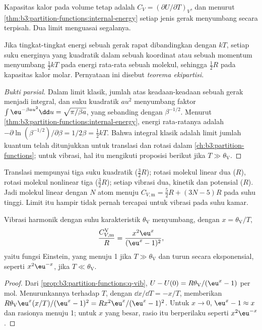 Kapasitas kalor pada volume tetap adalah $C_V = (\partial U/\partial T)_V$, dan
menurut \cref{thm:b3:partition-functions:internal-energy} setiap jenis gerak
menyumbang secara terpisah. Dua limit menguasai segalanya.

\begin{theorem}\label{thm:b3:statistical-thermo-applied:equipartition}
Jika tingkat-tingkat energi sebuah gerak rapat dibandingkan dengan $kT$,
setiap suku energinya yang kuadratik dalam sebuah koordinat atau sebuah
momentum menyumbang $\frac12kT$ pada energi rata-rata sebuah molekul, sehingga
$\frac12R$ pada kapasitas kalor molar. Pernyataan ini disebut \emph{teorema
ekipartisi}.
\end{theorem}

\begin{proof}[Bukti parsial]
Dalam limit klasik, jumlah atas keadaan-keadaan sebuah gerak menjadi integral,
dan suku kuadratik $a u^2$ menyumbang faktor $\int\eu^{-\beta au^2}\dd u =
\sqrt{\pi/\beta a}$, yang sebanding dengan $\beta^{-1/2}$. Menurut
\cref{thm:b3:partition-functions:internal-energy}, energi rata-ratanya adalah
$-\partial\ln(\beta^{-1/2})/\partial\beta = 1/2\beta = \frac12kT$. Bahwa integral klasik
adalah limit jumlah kuantum telah ditunjukkan untuk translasi dan rotasi dalam
\cref{ch:b3:partition-functions}; untuk vibrasi, hal itu mengikuti proposisi
berikut jika $T \gg \theta_{\mathrm V}$.
\end{proof}

Translasi mempunyai tiga suku kuadratik ($\frac32R$); rotasi molekul linear
dua ($R$), rotasi molekul nonlinear tiga ($\frac32R$); setiap vibrasi dua, kinetik
dan potensial ($R$). Jadi molekul linear dengan $N$ atom menuju
$C_{V,\mathrm m} = \frac52R + (3N - 5)R$ pada suhu tinggi. Limit itu hampir tidak
pernah tercapai untuk vibrasi pada suhu kamar.

\begin{proposition}\label{prop:b3:statistical-thermo-applied:cv-vib}
Vibrasi harmonik dengan suhu karakteristik $\theta_{\mathrm V}$ menyumbang, dengan
$x = \theta_{\mathrm V}/T$,
\[
  \frac{C_{V,\mathrm m}^{\mathrm V}}{R} = \frac{x^2\eu^x}{(\eu^x - 1)^2},
\]
yaitu fungsi Einstein, yang menuju 1 jika $T \gg \theta_{\mathrm V}$ dan turun secara
eksponensial, seperti $x^2\eu^{-x}$, jika $T \ll \theta_{\mathrm V}$.
\end{proposition}

\begin{proof}
Dari \cref{prop:b3:partition-functions:q-vib}, $U - U(0) = R\theta_{\mathrm V}/(\eu^x - 1)$ per
mol. Menurunkannya terhadap $T$, dengan $\dd x/\dd T = -x/T$, memberikan
$R\theta_{\mathrm V}\eu^x(x/T)/(\eu^x - 1)^2 = Rx^2\eu^x/(\eu^x - 1)^2$. Untuk $x \to 0$,
$\eu^x - 1 \approx x$ dan rasionya menuju 1; untuk $x$ yang besar, rasio itu
berperilaku seperti $x^2\eu^{-x}$.
\end{proof}

